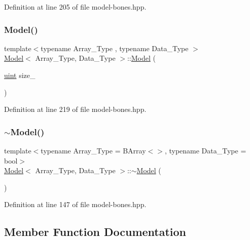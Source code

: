 Definition at line 205 of file model-\/bones.\+hpp.

\mbox{\label{class_model_a841a883c666ecd9b07385bfb36078bc5}} 
\subsubsection{\texorpdfstring{Model()}{Model()}\hspace{0.1cm}{\footnotesize\ttfamily [2/2]}}
{\footnotesize\ttfamily template$<$typename Array\+\_\+\+Type , typename Data\+\_\+\+Type $>$ \\
\hyperlink{class_model}{Model}$<$ Array\+\_\+\+Type, Data\+\_\+\+Type $>$\+::\hyperlink{class_model}{Model} (\begin{DoxyParamCaption}\item[{\hyperlink{typedefs_8hpp_a91ad9478d81a7aaf2593e8d9c3d06a14}{uint}}]{size\+\_\+ }\end{DoxyParamCaption})\hspace{0.3cm}{\ttfamily [inline]}}



Definition at line 219 of file model-\/bones.\+hpp.

\mbox{\label{class_model_aaed0a5937479c213e620bf8095ddea5d}} 
\subsubsection{\texorpdfstring{$\sim$\+Model()}{~Model()}}
{\footnotesize\ttfamily template$<$typename Array\+\_\+\+Type  = B\+Array$<$$>$, typename Data\+\_\+\+Type  = bool$>$ \\
\hyperlink{class_model}{Model}$<$ Array\+\_\+\+Type, Data\+\_\+\+Type $>$\+::$\sim$\hyperlink{class_model}{Model} (\begin{DoxyParamCaption}{ }\end{DoxyParamCaption})\hspace{0.3cm}{\ttfamily [inline]}}



Definition at line 147 of file model-\/bones.\+hpp.



\subsection{Member Function Documentation}
\mbox{\label{class_model_a28ad7090cb5b3f3be9e24d9aef15ce75}} 
